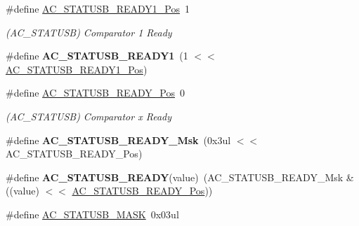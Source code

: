 \begin{DoxyCompactItemize}
\item 
\hypertarget{group___s_a_m_l21___a_c_gac6991f3944dc31c5897b9fef7107b25d}{}\#define \hyperlink{group___s_a_m_l21___a_c_gac6991f3944dc31c5897b9fef7107b25d}{A\+C\+\_\+\+S\+T\+A\+T\+U\+S\+B\+\_\+\+R\+E\+A\+D\+Y1\+\_\+\+Pos}~1\label{group___s_a_m_l21___a_c_gac6991f3944dc31c5897b9fef7107b25d}

\begin{DoxyCompactList}\small\item\em (A\+C\+\_\+\+S\+T\+A\+T\+U\+S\+B) Comparator 1 Ready \end{DoxyCompactList}\item 
\hypertarget{group___s_a_m_l21___a_c_gae68c7689a9c78196751f5157939e4100}{}\#define {\bfseries A\+C\+\_\+\+S\+T\+A\+T\+U\+S\+B\+\_\+\+R\+E\+A\+D\+Y1}~(1 $<$$<$ \hyperlink{group___s_a_m_l21___a_c_gac6991f3944dc31c5897b9fef7107b25d}{A\+C\+\_\+\+S\+T\+A\+T\+U\+S\+B\+\_\+\+R\+E\+A\+D\+Y1\+\_\+\+Pos})\label{group___s_a_m_l21___a_c_gae68c7689a9c78196751f5157939e4100}

\item 
\hypertarget{group___s_a_m_l21___a_c_ga97f22583e9717be73effe4c24a88d435}{}\#define \hyperlink{group___s_a_m_l21___a_c_ga97f22583e9717be73effe4c24a88d435}{A\+C\+\_\+\+S\+T\+A\+T\+U\+S\+B\+\_\+\+R\+E\+A\+D\+Y\+\_\+\+Pos}~0\label{group___s_a_m_l21___a_c_ga97f22583e9717be73effe4c24a88d435}

\begin{DoxyCompactList}\small\item\em (A\+C\+\_\+\+S\+T\+A\+T\+U\+S\+B) Comparator x Ready \end{DoxyCompactList}\item 
\hypertarget{group___s_a_m_l21___a_c_ga5d87d9f9e07305caa36db61678ce7ad3}{}\#define {\bfseries A\+C\+\_\+\+S\+T\+A\+T\+U\+S\+B\+\_\+\+R\+E\+A\+D\+Y\+\_\+\+Msk}~(0x3ul $<$$<$ A\+C\+\_\+\+S\+T\+A\+T\+U\+S\+B\+\_\+\+R\+E\+A\+D\+Y\+\_\+\+Pos)\label{group___s_a_m_l21___a_c_ga5d87d9f9e07305caa36db61678ce7ad3}

\item 
\hypertarget{group___s_a_m_l21___a_c_ga210c9ac99e879b97b08baeeae2386c1e}{}\#define {\bfseries A\+C\+\_\+\+S\+T\+A\+T\+U\+S\+B\+\_\+\+R\+E\+A\+D\+Y}(value)~(A\+C\+\_\+\+S\+T\+A\+T\+U\+S\+B\+\_\+\+R\+E\+A\+D\+Y\+\_\+\+Msk \& ((value) $<$$<$ \hyperlink{group___s_a_m_l21___a_c_ga97f22583e9717be73effe4c24a88d435}{A\+C\+\_\+\+S\+T\+A\+T\+U\+S\+B\+\_\+\+R\+E\+A\+D\+Y\+\_\+\+Pos}))\label{group___s_a_m_l21___a_c_ga210c9ac99e879b97b08baeeae2386c1e}

\item 
\hypertarget{group___s_a_m_l21___a_c_ga4e32c46f408ba606dc303acdd3e4e546}{}\#define \hyperlink{group___s_a_m_l21___a_c_ga4e32c46f408ba606dc303acdd3e4e546}{A\+C\+\_\+\+S\+T\+A\+T\+U\+S\+B\+\_\+\+M\+A\+S\+K}~0x03ul\label{group___s_a_m_l21___a_c_ga4e32c46f408ba606dc303acdd3e4e546}


\end{DoxyCompactItemize}
